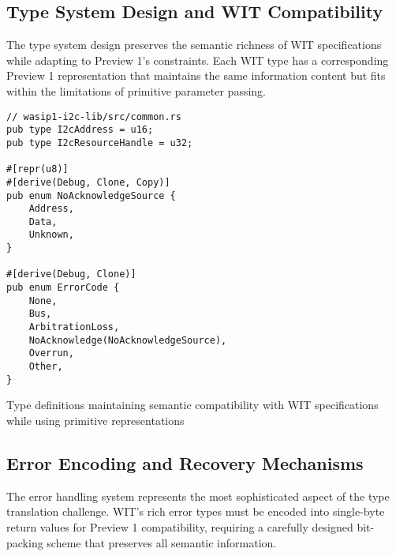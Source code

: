 \subsection{Type System Design and WIT Compatibility}

The type system design preserves the semantic richness of WIT specifications while adapting to Preview 1's constraints. Each WIT type has a corresponding Preview 1 representation that maintains the same information content but fits within the limitations of primitive parameter passing.

\begin{listing}[H]
\begin{verbatim}
// wasip1-i2c-lib/src/common.rs
pub type I2cAddress = u16;
pub type I2cResourceHandle = u32;

#[repr(u8)]
#[derive(Debug, Clone, Copy)]
pub enum NoAcknowledgeSource {
    Address,
    Data,
    Unknown,
}

#[derive(Debug, Clone)]
pub enum ErrorCode {
    None,
    Bus,
    ArbitrationLoss,
    NoAcknowledge(NoAcknowledgeSource),
    Overrun,
    Other,
}
\end{verbatim}
\caption{Type definitions maintaining semantic compatibility with WIT specifications while using primitive representations}
\label{lst:type-definitions}
\end{listing}

\subsection{Error Encoding and Recovery Mechanisms}

The error handling system represents the most sophisticated aspect of the type translation challenge. WIT's rich error types must be encoded into single-byte return values for Preview 1 compatibility, requiring a carefully designed bit-packing scheme that preserves all semantic information.

